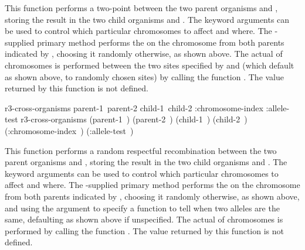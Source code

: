 {{This function performs a two-point  between the two
parent organisms  and , storing the result in the two
child organisms  and . The keyword arguments can be used
to control which particular chromosomes to affect and where. The \geco-supplied
primary method performs the  on the chromosome from both parents indicated
by , choosing it randomly otherwise, as shown above. The
actual  of chromosomes is performed between the two sites specified by
 and  (which default as shown above, to
randomly chosen sites) by calling the function .
The value returned by this function is not defined.
\par}%

\filbreak
{\samepage
\Defgeneric r3-cross-organisms {\hbox{parent-1 parent-2} \hbox{child-1 child-2}
                             \key :chromosome-index :allele-test}
\label{method:r3-cross-organisms}
 r3-cross-organisms {\hbox{(parent-1 )} \hbox{(parent-2 )}
                               \hbox{(child-1 )} \hbox{(child-2 )}
    \key \hbox{(:chromosome-index )}
         \hbox{(:allele-test )}}

This function performs a random respectful recombination 
\cite{ga:radcliffe92-11,ga:radcliffe92-04} between the two parent organisms
 and , storing the result in the two child organisms
 and . The keyword arguments can be used to control which
particular chromosomes to affect and where. The \geco-supplied primary method
performs the  on the chromosome from both parents indicated by
, choosing it randomly otherwise, as shown above, and using
the  argument to specify a function to tell when two alleles are
the same, defaulting as shown above if unspecified. The actual  of
chromosomes is performed by calling the function .
The value returned by this function is not defined.
\par}%

}
